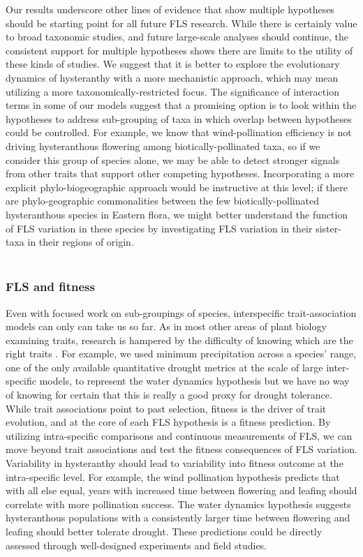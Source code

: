 \documentclass{article}
\begin{document}
\indent\indent Our results underscore other lines of evidence that show multiple hypotheses should be starting point for all future FLS research. While there is certainly value to broad taxonomic studies, and future large-scale analyses should continue, the consistent support for multiple hypotheses shows there are limits to the utility of these kinds of studies. We suggest that it is better to explore the evolutionary dynamics of hysteranthy with a more mechanistic approach, which may mean utilizing a more taxonomically-restricted focus. The significance of interaction terms in some of our models suggest that a promising option is to look within the hypotheses to address sub-grouping of taxa in which overlap between hypotheses could be controlled. For example, we know that wind-pollination efficiency is not driving hysteranthous flowering among biotically-pollinated taxa, so if we consider this group of species alone, we may be able to detect stronger signals from other traits that support other competing hypotheses. Incorporating a more explicit phylo-biogeographic approach would be instructive at this level; if there are phylo-geographic commonalities between the few biotically-pollinated hysteranthous species in Eastern flora, we might better understand the function of FLS variation in these species by investigating FLS variation in their sister-taxa in their regions of origin.\\ 

\subsubsection*{FLS and fitness}
Even with focused work on sub-groupings of species, interspecific trait-association models can only can take us so far. As in most other areas of plant biology examining traits, research is hampered by the difficulty of knowing which are the right traits \citep{}. For example, we used minimum precipitation across a species' range, one of the only available quantitative drought metrics at the scale of large inter-specific models, to represent the water dynamics hypothesis but we have no way of knowing for certain that this is really a good proxy for drought tolerance. \\

While trait associations point to past selection, fitness is the driver of trait evolution, and at the core of each FLS hypothesis is a fitness prediction. By utilizing intra-specific comparisons and continuous measurements of FLS, we can move beyond trait associations and test the fitness consequences of FLS variation. \\
\indent Variability in hysteranthy should lead to variability into fitness outcome at the intra-specific level. For example, the wind pollination hypothesis predicts that with all else equal, years with increased time between flowering and leafing should correlate with more pollination success. The water dynamics hypothesis suggests hysteranthous populations with a consistently larger time between flowering and leafing should better tolerate drought. These predictions could be directly assessed through well-designed experiments and field studies.\\
\end{document}

